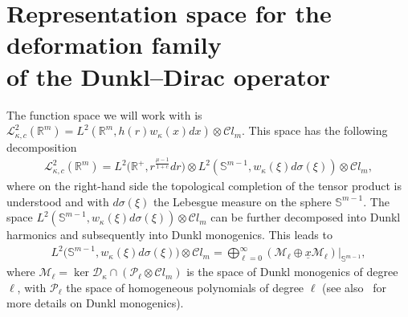 \documentclass[11pt]{article}
\numberwithin{equation}{section}
\numberwithin{theorem}{section}
\numberwithin{proposition}{section}
\numberwithin{lemma}{section}
\numberwithin{corollary}{section}
\numberwithin{definition}{section}
\numberwithin{example}{section}
\numberwithin{remark}{section}
\numberwithin{note}{section}
\theoremstyle{remark}
\newcommand{\mR}{\mathbb{R}}
\newcommand{\mS}{\mathbb{S}}
\newcommand{\cD}{\mathcal{D}}
\newcommand{\cM}{\mathcal{M}}
\newcommand{\cP}{\mathcal{P}}
\newcommand{\cC}{\mathcal{C}}
\newcommand{\cL}{\mathcal{L}}
\newcommand{\ux}{\underline{x}}
\def\k{{\kappa}}
\begin{document}
\section[Representation space for the deformation family of the Dunkl-Dirac
operator]{Representation space for the deformation family\\ of the Dunkl--Dirac
operator}\label{section4}

The function space we will work with is $\cL^{2}_{\k,c}(\mR^{m})=L^{2}(\mR^{m},h(r)w_{\k}(x)dx)
\otimes\cC l_{m}$.
This space has the following decomposition
\begin{gather*}
\cL^{2}_{\k,c}(\mR^{m})=L^{2}\big(\mR^{+},r^{\frac{\mu-1}{1+c}}dr\big)\otimes
L^{2}(\mS^{m-1},w_{\k}(\xi)d\sigma(\xi))\otimes\cC l_{m},
\end{gather*}
where on the right-hand side the topological completion of the tensor product is understood and
with $d\sigma(\xi)$ the Lebesgue measure on the sphere $\mS^{m-1}$.
The space $L^{2}(\mS^{m-1},w_{\k}(\xi)d\sigma(\xi))\otimes\cC l_{m}$ can be further decomposed
into Dunkl harmonics and subsequently into Dunkl monogenics.
This leads to
\begin{gather*}
L^{2}\big(\mS^{m-1},w_{\k}(\xi)d\sigma(\xi)\big)\otimes\cC l_{m}=\bigoplus_{\ell=0}^{\infty}
\left(\cM_{\ell}\oplus\ux\cM_{\ell}\right)\big|_{\mS^{m-1}},
\end{gather*}
where $\cM_{\ell}=\ker{\cD_{\k}}\cap\left(\cP_{\ell}\otimes\cC l_{m}\right)$ is the space
of Dunkl monogenics of degree $\ell$, with $\cP_{\ell}$ the space of homogeneous polynomials of
degree $\ell$ (see also~\cite{DBGeg} for more details on Dunkl monogenics).
\end{document}
